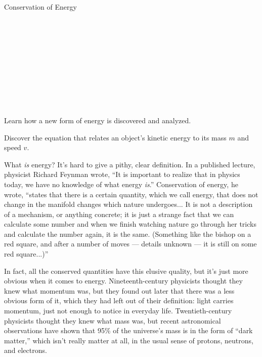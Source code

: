 \begin{lab}{Conservation of Energy}\label{lab:energy}

\apparatus
{}\\
\\
\\
\\
\\
\\
\\
\\
\\

\begin{goals}
\item[] Learn how a new form of energy is discovered and
analyzed.
\item[] Discover the equation that relates an object's kinetic energy to its mass $m$
and speed $v$.
\end{goals}

\labintroduction

What \emph{is} energy? It's hard to give a pithy, clear definition.
In a published lecture, physicist Richard Feynman wrote, ``It is
important to realize that in physics today, we have no knowledge of
what energy \emph{is}.'' Conservation of energy, he wrote, ``states that there is
a certain quantity, which we call energy, that does not change in the manifold
changes which nature undergoes... It is not a description of a mechanism, or anything
concrete; it is just a strange fact that we can calculate some number and when we finish
watching nature go through her tricks and calculate the number again, it is the same. (Something
like the bishop on a red square, and after a number of moves --- details unknown --- it is still on
some red square...)''%


In fact, all the conserved quantities have this elusive quality, but it's just more obvious
when it comes to energy. Nineteenth-century physicists thought they knew what momentum was,
but they found out later that there was a less obvious form of it, which they had left out
of their definition: light carries momentum, just not enough to notice in everyday life.
Twentieth-century physicists thought they knew what mass was, but recent astronomical observations
have shown that 95\% of the universe's mass is in the form of ``dark matter,'' which isn't really
matter at all, in the usual sense of protons, neutrons, and electrons.


\end{lab}
